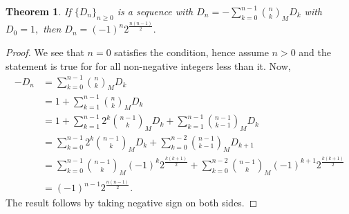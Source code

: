 \documentclass[12pt, a4paper]{article}
\newtheorem{theorem}{Theorem}[section]
\begin{document}
\begin{theorem}
If $\{D_n\}_{n\geq 0}$ is a sequence with 
$D_n = -\sum_{k=0}^{n-1}\binom{n}{k}_MD_k$
with $D_0 = 1,$
then $D_n = (-1)^n2^{\frac{n(n-1)}{2}}.$
\end{theorem}
\begin{proof}
We see that $n = 0$ satisfies the condition, hence assume $n > 0$ and the statement is true for for all non-negative integers less than it. Now,
\begin{align*}
-D_n &= \sum_{k=0}^{n-1}\binom{n}{k}_MD_k\\
&= 1+ \sum_{k=1}^{n-1}\binom{n}{k}_MD_k\\
&= 1+ \sum_{k=1}^{n-1}2^k\binom{n-1}{k}_MD_k + \sum_{k=1}^{n-1}\binom{n-1}{k-1}_MD_k\\
&= \sum_{k=0}^{n-1}2^k\binom{n-1}{k}_MD_k + \sum_{k=0}^{n-2}\binom{n-1}{k-1}_MD_{k+1}\\
&= \sum_{k=0}^{n-1}\binom{n-1}{k}_M(-1)^k 2^{\frac{k(k+1)}{2}}+
\sum_{k=0}^{n-2}\binom{n-1}{k}_M(-1)^{k+1} 2^{\frac{k(k+1)}{2}}\\
&= (-1)^{n-1}2^{\frac{n(n-1)}{2}}.
\end{align*}
The result follows by taking negative sign on both sides.
\end{proof}
\end{document}
